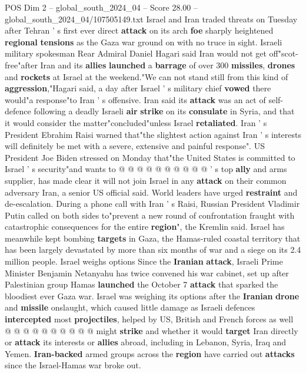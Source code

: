 \begin{textsample}{POS Dim 2 – global\_south\_2024\_04 – Score 28.00 – global\_south\_2024\_04/107505149.txt}  \label{ex:f2_pos_045}
Israel and Iran traded threats on Tuesday after Tehran ' s first ever direct \textbf{attack} on its arch \textbf{foe} sharply heightened \textbf{regional} \textbf{tensions} as the Gaza war ground on with no truce in sight.
Israeli military spokesman Rear Admiral Daniel Hagari said Iran would not get off"scot-free"after Iran and its \textbf{allies} \textbf{launched} a \textbf{barrage} of over 300 \textbf{missiles}, \textbf{drones} and \textbf{rockets} at Israel at the weekend."We can not stand still from this kind of \textbf{aggression},"Hagari said, a day after Israel ' s military chief \textbf{vowed} there would"a response"to Iran ' s offensive.
Iran said its \textbf{attack} was an act of self-defence following a deadly Israeli \textbf{air} \textbf{strike} on its \textbf{consulate} in Syria, and that it would consider the matter"concluded"unless Israel \textbf{retaliated}.
Iran ' s President Ebrahim Raisi warned that"the slightest action against Iran ' s interests will definitely be met with a severe, extensive and painful response".
US President Joe Biden stressed on Monday that"the United States is committed to Israel ' s security"and wants to @ @ @ @ @ @ @ @ @ @ ' s top \textbf{ally} and arms supplier, has made clear it will not join Israel in any \textbf{attack} on their common adversary Iran, a senior US official said.
World leaders have urged \textbf{restraint} and de-escalation.
During a phone call with Iran ' s Raisi, Russian President Vladimir Putin called on both sides to"prevent a new round of confrontation fraught with catastrophic consequences for the entire \textbf{region}", the Kremlin said.
Israel has meanwhile kept bombing \textbf{targets} in Gaza, the Hamas-ruled coastal territory that has been largely devastated by more than six months of war and a siege on its 2.4 million people.
Israel weighs options Since the \textbf{Iranian} \textbf{attack}, Israeli Prime Minister Benjamin Netanyahu has twice convened his war cabinet, set up after Palestinian group Hamas \textbf{launched} the October 7 \textbf{attack} that sparked the bloodiest ever Gaza war.
Israel was weighing its options after the \textbf{Iranian} \textbf{drone} and \textbf{missile} onslaught, which caused little damage as Israeli defences \textbf{intercepted} most \textbf{projectiles}, helped by US, British and French forces as well @ @ @ @ @ @ @ @ @ @ might \textbf{strike} and whether it would \textbf{target} Iran directly or \textbf{attack} its interests or \textbf{allies} abroad, including in Lebanon, Syria, Iraq and Yemen. \textbf{Iran-backed} armed groups across the \textbf{region} have carried out \textbf{attacks} since the Israel-Hamas war broke out.

\end{textsample}
